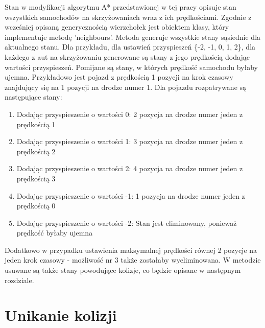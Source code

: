 Stan w modyfikacji algorytmu A* przedstawionej w tej pracy opisuje stan wszystkich samochodów na skrzyżowaniach wraz z ich prędkościami. Zgodnie z wcześniej opisaną generycznością wierzchołek jest obiektem klasy, który implementuje metodę 'neighbours'. Metoda generuje wszystkie stany sąsiednie dla aktualnego stanu. Dla przykładu, dla ustawień przyspieszeń \{-2, -1, 0, 1, 2\}, dla każdego z aut na skrzyżowaniu generowane są stany z jego prędkością dodając wartości przyspieszeń. Pomijane są stany, w których prędkość samochodu byłaby ujemna. Przykładowo jest pojazd z prędkością 1 pozycji na krok czasowy znajdujący się na 1 pozycji na drodze numer 1. Dla pojazdu rozpatrywane są następujące stany:
\begin{enumerate}
\item Dodając przyspieszenie o wartości 0: 2 pozycja na drodze numer jeden z prędkością 1
\item Dodając przyspieszenie o wartości 1: 3 pozycja na drodze numer jeden z prędkością 2
\item Dodając przyspieszenie o wartości 2: 4 pozycja na drodze numer jeden z prędkością 3
\item Dodając przyspieszenie o wartości -1: 1 pozycja na drodze numer jeden z prędkością 0
\item Dodając przyspieszenie o wartości -2: Stan jest eliminowany, ponieważ prędkość byłaby ujemna
\end{enumerate}
Dodatkowo w przypadku ustawienia maksymalnej prędkości równej 2 pozycje na jeden krok czasowy - możliwość nr 3 także zostałaby wyeliminowana.
\newline
\newline
W metodzie usuwane są także stany powodujące kolizje, co będzie opisane w następnym rozdziale.

\section{Unikanie kolizji}

